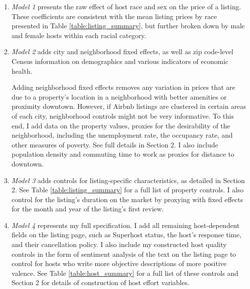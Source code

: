 \begin{enumerate}
	\item \textit{Model 1} presents the raw effect of host race and sex on the price of a listing. These coefficients are consistent with the mean listing prices by race presented in Table \ref{table:listing_summary}, but further broken down by male and female hosts within each racial category.
	
	\item \textit{Model 2} adds city and neighborhood fixed effects, as well as zip code-level Census information on demographics and various indicators of economic health. 
	
	Adding neighborhood fixed effects removes any variation in prices that are due to a property's location in a neighborhood with better amenities or proximity downtown. However, if Airbnb listings are clustered in certain areas of each city, neighborhood controls might not be very informative. To this end, I add data on the property values, proxies for the desirability of the neighborhood, including the unemployment rate, the occupancy rate, and other measures of poverty. See full details in Section 2. I also include population density and commuting time to work as proxies for distance to downtown. 
		
	\item \textit{Model 3} adds controls for listing-specific characteristics, as detailed in Section 2. See Table \ref{table:listing_summary} for a full list of property controls. I also control for the listing's duration on the market by proxying with fixed effects for the month and year of the listing's first review.
	
	\item \textit{Model 4} represents my full specification. I add all remaining host-dependent fields on the listing page, such as Superhost status, the host's response time, and their cancellation policy. I also include my constructed host quality controls in the form of sentiment analysis of the text on the listing page to control for hosts who write more objective descriptions of more positive valence. See Table \ref{table:host_summary} for a full list of these controls and Section 2 for details of construction of host effort variables. 
\end{enumerate}




